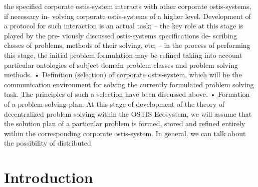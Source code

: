 \documentclass{article}
\begin{document}
the specified corporate ostis-system interacts with
other corporate ostis-systems, if necessary in-
volving corporate ostis-systems of a higher level.
Development of a protocol for such interaction is
an actual task;
– the key role at this stage is played by the pre-
viously discussed ostis-systems specifications de-
scribing classes of problems, methods of their
solving, etc;
– in the process of performing this stage, the initial
problem formulation may be refined taking into
account particular ontologies of subject domain
problem classes and problem solving methods.
• Definition (selection) of corporate ostis-system,
which will be the communication environment for
solving the currently formulated problem solving
task. The principles of such a selection have been
discussed above.
• Formation of a problem solving plan. At this
stage of development of the theory of decentralized
problem solving within the OSTIS Ecosystem, we
will assume that the solution plan of a particular
problem is formed, stored and refined entirely within
the corresponding corporate ostis-system. In general,
we can talk about the possibility of distributed

\section{Introduction}
\end{document}
